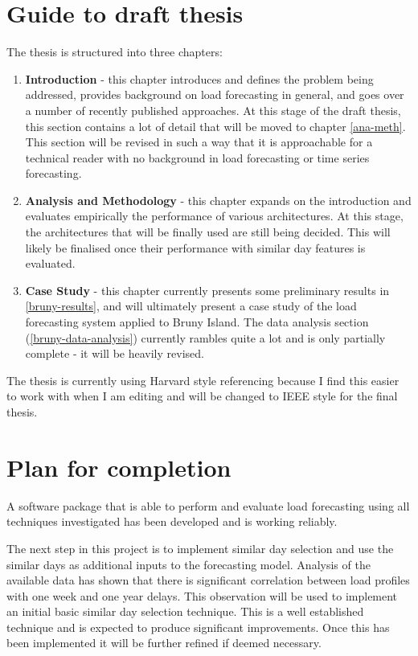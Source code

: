 \section*{Guide to draft thesis}
The thesis is structured into three chapters:
\begin{enumerate}
	\item \textbf{Introduction} - this chapter introduces and defines the problem being addressed, provides background on load forecasting in general, and goes over a number of recently published approaches. 
	At this stage of the draft thesis, this section contains a lot of detail that will be moved to chapter \ref{ana-meth}.
	This section will be revised in such a way that it is approachable for a technical reader with no background in load forecasting or time series forecasting.
	\item \textbf{Analysis and Methodology} - this chapter expands on the introduction and evaluates empirically the performance of various architectures.
	At this stage, the architectures that will be finally used are still being decided.
	This will likely be finalised once their performance with similar day features is evaluated.
	\item \textbf{Case Study} - this chapter currently presents some preliminary results in \ref{bruny-results}, and will ultimately present a case study of the load forecasting system applied to Bruny Island.
	The data analysis section (\ref{bruny-data-analysis}) currently rambles quite a lot and is only partially complete - it will be heavily revised.
\end{enumerate}

The thesis is currently using Harvard style referencing because I find this easier to work with when I am editing and will be changed to IEEE style for the final thesis.

\section*{Plan for completion}
A software package that is able to perform and evaluate load forecasting using all techniques investigated has been developed and is working reliably.

The next step in this project is to implement similar day selection and use the similar days as additional inputs to the forecasting model.
Analysis of the available data has shown that there is significant correlation between load profiles with one week and one year delays.
This observation will be used to implement an initial basic similar day selection technique.
This is a well established technique and is expected to produce significant improvements.
Once this has been implemented it will be further refined if deemed necessary.

